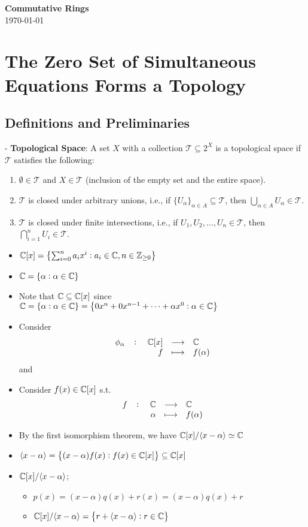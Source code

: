\documentclass[11pt,openany]{article}
\begin{document}
	\begin{center}
		\huge\textbf{Commutative Rings}\\
		\vspace{0.5em}
		\vspace{0.5em}
		\normalsize{\today}\\
	\end{center}
	
\section*{The Zero Set of Simultaneous Equations Forms a Topology}
\subsection*{Definitions and Preliminaries}

- \textbf{Topological Space}: A set \( X \) with a collection \( \mathcal{T} \subseteq 2^X \) is a topological space if \( \mathcal{T} \) satisfies the following:
\begin{enumerate}
	\item \( \emptyset \in \mathcal{T} \) and \( X \in \mathcal{T} \) (inclusion of the empty set and the entire space).
	\item \( \mathcal{T} \) is closed under arbitrary unions, i.e., if \( \{ U_\alpha \}_{\alpha \in A} \subseteq \mathcal{T} \), then \( \bigcup_{\alpha \in A} U_\alpha \in \mathcal{T} \).
	\item \( \mathcal{T} \) is closed under finite intersections, i.e., if \( U_1, U_2, \ldots, U_n \in \mathcal{T} \), then \( \bigcap_{i=1}^n U_i \in \mathcal{T} \).
\end{enumerate}

\newpage
\begin{itemize}
	\item $\mathbb{C}[x]=\set{\sum_{i=0}^{n}a_ix^i:a_i\in\mathbb{C}, n\in\mathbb{Z}_{\geq 0}}$
	\item $\mathbb{C}=\set{\alpha:\alpha\in\mathbb{C}}$
	\item Note that $\mathbb{C}\subseteq\mathbb{C}[x]$ since $\mathbb{C}=\set{\alpha:\alpha\in\mathbb{C}}=\set{0x^n+0x^{n-1}+\cdots+\alpha x^0:\alpha\in\mathbb{C}}$
	\item Consider \[
	\fullfunction{\phi_\alpha}{\C[x]}{\C}{f}{f(\alpha)}
	\] and 
	\item Consider $f(x)\in\mathbb{C}[x]$ s.t. \[
	\fullfunction{f}{\C}{\C}{\alpha}{f(\alpha)}
	\]
	\item By the first isomorphism theorem, we have $\mathbb{C}[x]/\langle x-\alpha \rangle\simeq\mathbb{C}$
	\item $\langle x-\alpha \rangle=\set{(x-\alpha)f(x):f(x)\in\mathbb{C}[x]}\subseteq\mathbb{C}[x]$
	\item $\mathbb{C}[x]/\langle x-\alpha \rangle$;
	\begin{itemize}
		\item $p(x)=(x-\alpha)q(x)+r(x)=(x-\alpha)q(x)+r$
		\item $\mathbb{C}[x]/\langle x-\alpha \rangle=\set{r+\langle x-\alpha \rangle:r\in\mathbb{C}}$
	\end{itemize}
\end{itemize}
\end{document}

